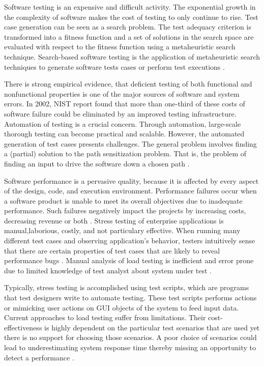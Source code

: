 \documentclass[espaco=umemeio,chapter=TITLE,twoside,openright]{abnt}
\begin{document}
Software testing is an expensive and difficult activity. The exponential
growth in the complexity of software makes the cost of testing to only continue to rise. Test case generation can be seen as a search problem. The test adequacy criterion is transformed into a fitness function and a set of solutions in the search
space are evaluated with respect to the fitness function using a metaheuristic search technique. Search-based software testing is the application of metaheuristic search techniques to generate software
tests cases or perform test executions \cite{Afzal2009a}.

There is strong empirical evidence, that deficient
testing of both functional and nonfunctional properties
is one of the major sources of software and system errors. In 2002, NIST  report found that more than one-third of these costs of software failure could be eliminated by an improved testing infrastructure.
Automation of testing is a crucial concern. Through
automation, large-scale thorough testing can become
practical and scalable. However, the automated generation of test cases presents challenges. The general problem involves finding a (partial) solution to the path sensitization problem. That is, the problem of finding an input to drive the software down a chosen path \cite{Harman2010} \cite{dean2003managing}.

Software performance is a pervasive quality, because it is affected by every aspect of the design, code, and execution environment. Performance failures occur when a software product is unable to meet its overall objectives due to inadequate performance. Such failures negatively impact the projects by increasing costs, decreasing revenue or both \cite{Vetoio2011}. Stress testing of enterprise applications is manual,laborious, costly, and not particulary effective. When running many different test cases and observing application’s behavior, testers intuitively sense that there are certain properties of test cases that are likely to reveal performance bugs \cite{Grechanik2012}. Manual analysis of load testing is inefficient and error prone due to limited knowledge of test analyst about system under test \cite{Arslan2015}.

Typically, stress testing is accomplished using test scripts, which are programs that test designers write to automate testing. These test scripts performs actions or mimicking user actions on GUI objects of the system to feed input data. Current approaches to load testing suffer from limitations. Their cost-effectiveness is highly dependent on the particular test scenarios that are used yet there is no support for choosing those scenarios. A poor choice of scenarios could lead to underestimating system response time thereby missing an opportunity to detect a performance \cite{Grechanik2012}.
\end{document}

